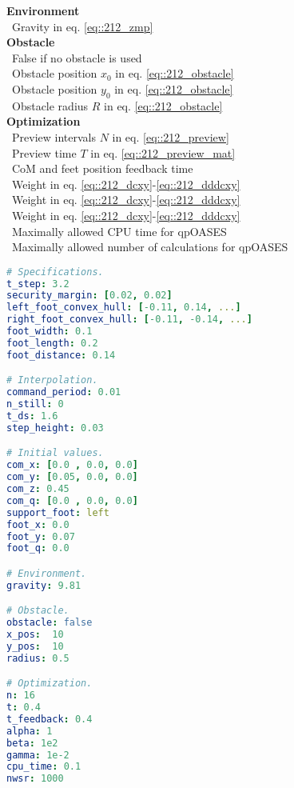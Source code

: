 \begin{minipage}[t]{1.\textwidth}
\begin{minipage}{0.5\textwidth}
{			\hfill \textbf{Environment}\\
			\mbox{}~\hfill Gravity in eq. \ref{eq::212_zmp}\\
			
			\hfill \textbf{Obstacle}\\
			\mbox{}~\hfill False if no obstacle is used\\
			\mbox{}~\hfill Obstacle position $x_0$ in eq. \ref{eq::212_obstacle}\\
			\mbox{}~\hfill Obstacle position $y_0$ in eq. \ref{eq::212_obstacle}\\
			\mbox{}~\hfill Obstacle radius $R$ in eq. \ref{eq::212_obstacle}\\
			
			\hfill \textbf{Optimization}\\
			\mbox{}~\hfill Preview intervals $N$ in eq. \ref{eq::212_preview}\\
			\mbox{}~\hfill Preview time $T$ in eq. \ref{eq::212_preview_mat}\\
			\mbox{}~\hfill CoM and feet position feedback time\\
			\mbox{}~\hfill Weight in eq. \ref{eq::212_dcxy}-\ref{eq::212_dddcxy}\\
			\mbox{}~\hfill Weight in eq. \ref{eq::212_dcxy}-\ref{eq::212_dddcxy}\\
			\mbox{}~\hfill Weight in eq. \ref{eq::212_dcxy}-\ref{eq::212_dddcxy}\\
			\mbox{}~\hfill Maximally allowed CPU time for qpOASES\\
			\mbox{}~\hfill Maximally allowed number of calculations for qpOASES}
	\end{minipage}
	\begin{minipage}{0.5\textwidth}
		\begin{lstlisting}[language=yaml]
# Specifications.
t_step: 3.2
security_margin: [0.02, 0.02]
left_foot_convex_hull: [-0.11, 0.14, ...]
right_foot_convex_hull: [-0.11, -0.14, ...]
foot_width: 0.1
foot_length: 0.2
foot_distance: 0.14

# Interpolation.
command_period: 0.01
n_still: 0
t_ds: 1.6
step_height: 0.03

# Initial values.
com_x: [0.0 , 0.0, 0.0]
com_y: [0.05, 0.0, 0.0]
com_z: 0.45
com_q: [0.0 , 0.0, 0.0]
support_foot: left
foot_x: 0.0
foot_y: 0.07
foot_q: 0.0

# Environment.
gravity: 9.81

# Obstacle.
obstacle: false
x_pos:  10
y_pos:  10
radius: 0.5

# Optimization.
n: 16
t: 0.4
t_feedback: 0.4
alpha: 1
beta: 1e2
gamma: 1e-2
cpu_time: 0.1
nwsr: 1000
		\end{lstlisting}
	\end{minipage}
\end{minipage}
